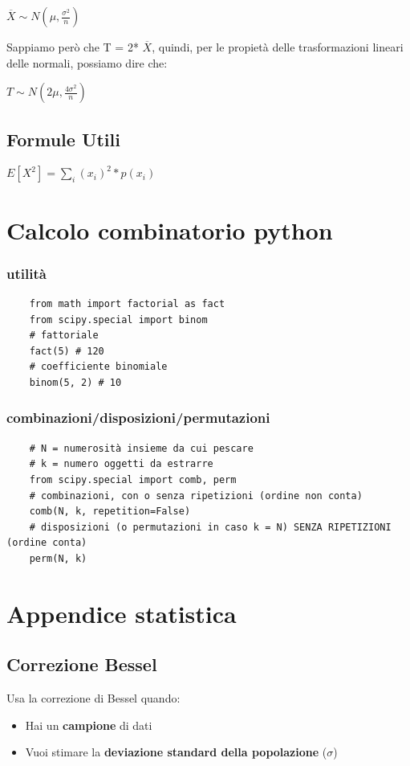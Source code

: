\documentclass{article}
\begin{document}
$\overline{X} \sim N(\mu, \frac{\sigma^2}{n})$

Sappiamo però che T = 2* $\overline{X}$, quindi, per le propietà delle trasformazioni lineari delle normali, possiamo dire che:

$T \sim N (2 \mu, \frac{4 \sigma^2}{n})$

\subsection*{Formule Utili}

$E[X^2] = \sum_{i}(x_i)^2*p(x_i)$

\section{Calcolo combinatorio python}

\subsubsection*{utilità}

\begin{lstlisting}
    from math import factorial as fact
    from scipy.special import binom
    # fattoriale
    fact(5) # 120
    # coefficiente binomiale
    binom(5, 2) # 10
\end{lstlisting}

\subsubsection*{combinazioni/disposizioni/permutazioni}

\begin{lstlisting}
    # N = numerosità insieme da cui pescare
    # k = numero oggetti da estrarre
    from scipy.special import comb, perm
    # combinazioni, con o senza ripetizioni (ordine non conta)
    comb(N, k, repetition=False)
    # disposizioni (o permutazioni in caso k = N) SENZA RIPETIZIONI (ordine conta)
    perm(N, k)
\end{lstlisting}

\section*{Appendice statistica}

\subsection*{Correzione Bessel}
Usa la correzione di Bessel quando:
\begin{itemize}
    \item Hai un \textbf{campione} di dati
    \item Vuoi stimare la \textbf{deviazione standard della popolazione} ($\sigma$)
\end{itemize}
\end{document}
